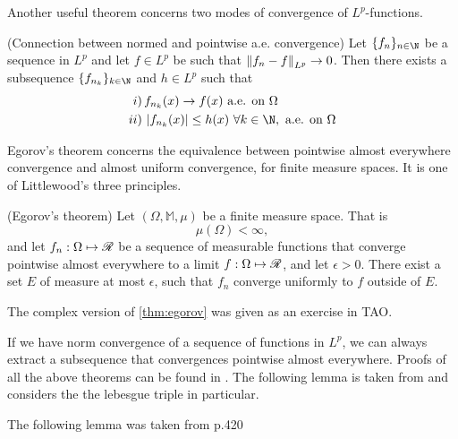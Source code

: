 \begin{definition}
\begin{definition}
Another useful theorem concerns two modes of convergence of $L^p$-functions.

\begin{theorem}(Connection between normed and pointwise a.e. convergence) \label{thm:lp_implies_a.e.}
	Let $\{f_n\}_{n \in \N}$ be a sequence in $L^p$ and let $f \in L^p$ be such that $\left\lVert f_n - f\right\rVert_{L^p} \rightarrow 0$. 
	Then there exists a subsequence $\{f_{n_k}\}_{k \in \N}$ and $h \in L^p$ such that
	\begin{align}
		i) & \, f_{n_k}(x) \rightarrow f(x) \text{ a.e. on }\Omega \\
		ii) & \, \left| f_{n_k}(x)\right| \leq h(x) \,\, \forall k\in \N, \text{ a.e. on } \Omega
	\end{align}
\end{theorem}

Egorov's theorem concerns the equivalence between pointwise almost everywhere convergence and almost uniform convergence, for finite measure spaces. It is one of Littlewood's three principles. 

\begin{theorem}(Egorov's theorem) \label{thm:egorov}
	Let $(\Omega, \mathbb{M}, \mu)$ be a finite measure space. That is 
	\begin{equation}
		\mu(\Omega) < \infty,
	\end{equation}
	and let $f_n : \Omega \mapsto \mathscr{R}$ be a sequence of measurable functions that converge pointwise almost everywhere to a limit $f: \Omega \mapsto \mathscr{R}$, and let $\epsilon > 0$. There exist a set $E$ of measure at most $\epsilon$, such that $f_n$ converge uniformly to $f$ outside of $E$. 
\end{theorem} 
The complex version of \eqref{thm:egorov} was given as an exercise in TAO. 


 If we have norm convergence of a sequence of functions in $L^p$, we can always extract a subsequence that convergences pointwise almost everywhere. Proofs of all the above theorems can be found in \textcite{brezis2010functional}. The following lemma is taken from \textcite[p.410]{holden2015front} and considers the the lebesgue triple in particular. 
 

The following lemma was taken from p.420 \cite{holden2015front}
 

\end{definition}
\end{definition}
